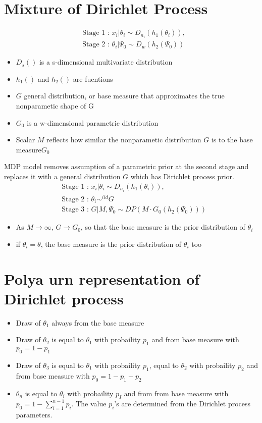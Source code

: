 \documentclass[11pt]{article}
\begin{document}
\section{Mixture of Dirichlet Process}
\begin{align*}
&\text{Stage 1 : } x_i | \theta_i \sim D_{n_i}(h_1(\theta_i)),\\
&\text{Stage 2 : } \theta_i | \Psi_0 \sim D_{w}(h_2(\Psi_0))
\end{align*}
\begin{itemize}
	\item $D_s()$ is a s-dimensional multivariate distribution
	\item $h_1()$ and $h_2()$ are fucntions
	\item $G$ general distribution, or base measure that approximates the true nonparametic shape of G
	\item $G_0$ is a w-dimensional parametric distribution
	\item Scalar $M$ reflects  how similar the nonparametic distribution $G$ is to the base measure$G_0$
\end{itemize}
MDP model removes assumption of a parametric prior at the second stage and replaces it with a general distribution $G$ which has Dirichlet process prior.
\begin{align*}
&\text{Stage 1 : } x_i | \theta_i \sim D_{n_i}(h_1(\theta_i)),\\
&\text{Stage 2 : } \theta_i \sim^{iid} G\\
&\text{Stage 3 : } G | M, \Psi_0 \sim DP(M\cdot G_0(h_2(\Psi_0)))
\end{align*}
\begin{itemize}
	\item As $M \rightarrow \infty$, $G \rightarrow G_0$, so that the base measure is the prior distribution of $\theta_i$
	\item if $\theta_i = \theta$, the base measure is the prior distribution of $\theta_i$ too
\end{itemize}
\section{Polya urn representation of Dirichlet process}
\begin{itemize}
	\item Draw of $\theta_1$ always from the base measure
	\item Draw of $\theta_2$ is equal to $\theta_1$ with probaility $p_1$ and from base measure with $p_0 = 1- p_1$
	\item Draw of $\theta_3$ is equal to $\theta_1$ with probaility $p_1$, equal to $\theta_2$ with probaility $p_2$ and from base measure with $p_0 = 1- p_1 - p_2$
	\item $\theta_n$ is equal to $\theta_i$ with probaility $p_I$ and from from base measure with $p_0 = 1- \sum_{i=1}^{n-1}p_i$. The value $p_i$'s are determined from the Dirichlet process parameters.
\end{itemize}
\end{document}
